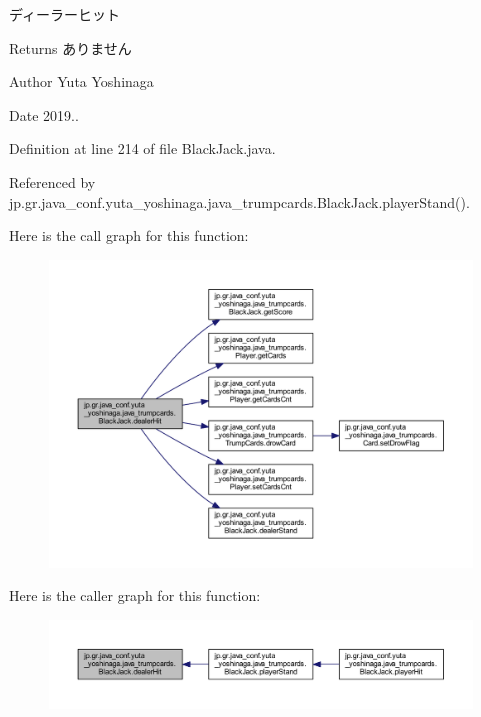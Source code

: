 ディーラーヒット 

\begin{DoxyReturn}{Returns}
ありません 
\end{DoxyReturn}
\begin{DoxyAuthor}{Author}
Yuta Yoshinaga 
\end{DoxyAuthor}
\begin{DoxyDate}{Date}
2019.. 
\end{DoxyDate}


Definition at line 214 of file Black\+Jack.\+java.



Referenced by jp.\+gr.\+java\+\_\+conf.\+yuta\+\_\+yoshinaga.\+java\+\_\+trumpcards.\+Black\+Jack.\+player\+Stand().

Here is the call graph for this function\+:
\nopagebreak
\begin{figure}[H]
\begin{center}
\leavevmode
\includegraphics[width=350pt]{classjp_1_1gr_1_1java__conf_1_1yuta__yoshinaga_1_1java__trumpcards_1_1_black_jack_a3db7b3231ab583af54941a41517954ea_cgraph}
\end{center}
\end{figure}
Here is the caller graph for this function\+:
\nopagebreak
\begin{figure}[H]
\begin{center}
\leavevmode
\includegraphics[width=350pt]{classjp_1_1gr_1_1java__conf_1_1yuta__yoshinaga_1_1java__trumpcards_1_1_black_jack_a3db7b3231ab583af54941a41517954ea_icgraph}
\end{center}
\end{figure}
